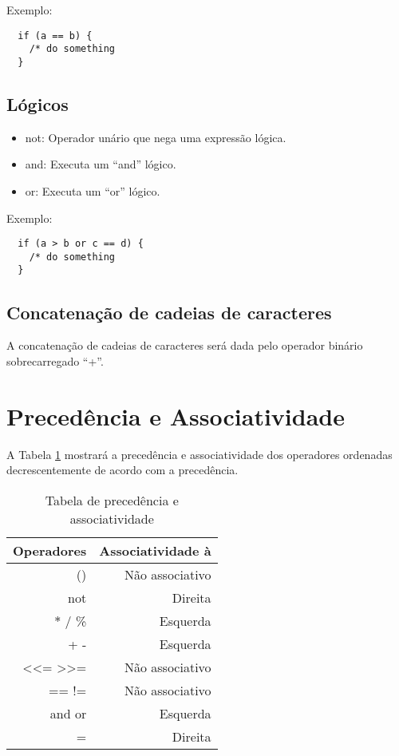 \documentclass[a4paper, 12pt, article]{memoir}
\begin{document}
Exemplo:
\begin{lstlisting}
  if (a == b) {
    /* do something
  }
\end{lstlisting}

\subsection{Lógicos}
\label{subsec:logicos}
\begin{itemize}
\item not: Operador unário que nega uma expressão lógica.
\item and: Executa um ``and'' lógico.
\item or: Executa um ``or'' lógico.
\end{itemize}

Exemplo:
\begin{lstlisting}
  if (a > b or c == d) {
    /* do something
  }
\end{lstlisting}

\subsection{Concatenação de cadeias de caracteres}
\label{subsec:concatenacao}
A concatenação de cadeias de caracteres será dada pelo operador binário sobrecarregado ``+''.

\section{Precedência e Associatividade}
\label{sec:precedencia}
A Tabela \ref{tab:precedencia} mostrará a precedência e associatividade dos
operadores ordenadas decrescentemente de acordo com a precedência.
\begin{table}[h]
  \centering
  \begin{tabular}{r|r}

    Operadores & Associatividade à \\
    \hline
    () & Não associativo \\
    not & Direita \\
    $*$ / \% & Esquerda \\
    + - & Esquerda \\
    \textless \textless= \textgreater \textgreater= & Não associativo \\
    == != & Não associativo \\
    and or & Esquerda \\
    = & Direita

  \end{tabular}
  \caption{Tabela de precedência e associatividade}
  \label{tab:precedencia}
\end{table}
\end{document}
